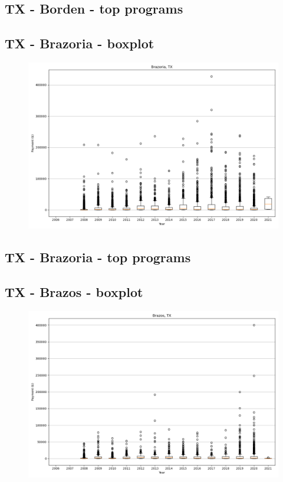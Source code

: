 \subsection*{TX - Borden - top programs}

\newpage
\subsection*{TX - Brazoria - boxplot}
\begin{figure}[h]
\centering
\includegraphics[width=7in]{../output/boxplots/counties/Brazoria-TX_boxplot.png}
\end{figure}


\subsection*{TX - Brazoria - top programs}

\newpage
\subsection*{TX - Brazos - boxplot}
\begin{figure}[h]
\centering
\includegraphics[width=7in]{../output/boxplots/counties/Brazos-TX_boxplot.png}
\end{figure}


